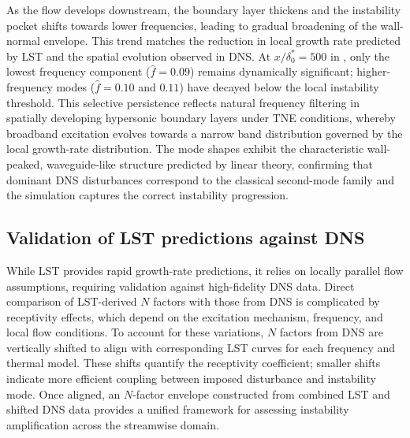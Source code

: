 As the flow develops downstream, the boundary layer thickens and the instability pocket shifts towards lower frequencies, leading to gradual broadening of the wall-normal envelope. This trend matches the reduction in local growth rate predicted by \gls{LST} and the spatial evolution observed in \gls{DNS}. At $x/\delta^{*}_{0} = 500$ in , only the lowest frequency component ($\hat{f} = 0.09$) remains dynamically significant; higher-frequency modes ($\hat{f} = 0.10$ and $0.11$) have decayed below the local instability threshold. This selective persistence reflects natural frequency filtering in spatially developing hypersonic boundary layers under \gls{TNE} conditions, whereby broadband excitation evolves towards a narrow band distribution governed by the local growth-rate distribution. The mode shapes exhibit the characteristic wall-peaked, waveguide-like structure predicted by linear theory, confirming that dominant \gls{DNS} disturbances correspond to the classical second-mode family and the simulation captures the correct instability progression.




\subsection{Validation of LST predictions against DNS}
While \gls{LST} provides rapid growth-rate predictions, it relies on locally parallel flow assumptions, requiring validation against high-fidelity \gls{DNS} data. Direct comparison of \gls{LST}-derived $N$ factors with those from \gls{DNS} is complicated by receptivity effects, which depend on the excitation mechanism, frequency, and local flow conditions. To account for these variations, $N$ factors from \gls{DNS} are vertically shifted to align with corresponding \gls{LST} curves for each frequency and thermal model. These shifts quantify the receptivity coefficient; smaller shifts indicate more efficient coupling between imposed disturbance and instability mode. Once aligned, an $N$-factor envelope constructed from combined \gls{LST} and shifted \gls{DNS} data provides a unified framework for assessing instability amplification across the streamwise domain.

